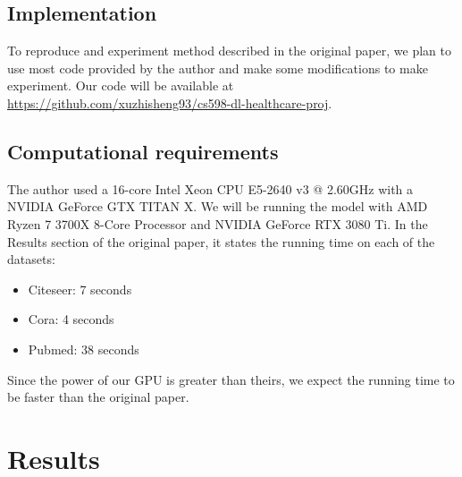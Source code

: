 \documentclass[11pt,a4paper]{article}
\begin{document}
\subsection{Implementation}

To reproduce and experiment method described in the original paper, we plan to use most code provided by the author and make some modifications to make experiment. Our code will be available at \url{https://github.com/xuzhisheng93/cs598-dl-healthcare-proj}.



\subsection{Computational requirements}

The author used a 16-core Intel Xeon CPU E5-2640 v3 @ 2.60GHz with a NVIDIA GeForce GTX TITAN X. We will be running the model with AMD Ryzen 7 3700X 8-Core Processor and NVIDIA GeForce RTX 3080 Ti. In the Results section of the original paper, it states the running time on each of the datasets:

\begin{itemize}
  \item Citeseer: 7 seconds
  \item Cora: 4 seconds
  \item Pubmed: 38 seconds
\end{itemize}

Since the power of our GPU is greater than theirs, we expect the running time to be faster than the original paper.

\section{Results}
\end{document}
